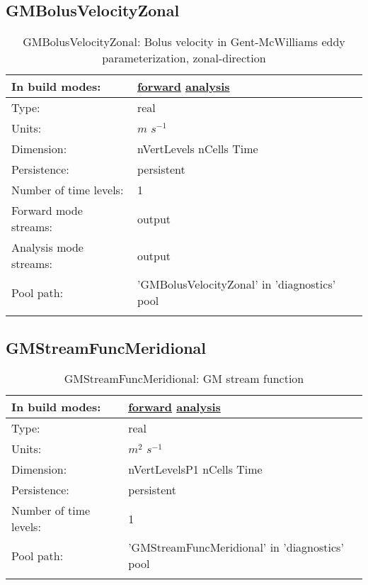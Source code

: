 \subsection[GMBolusVelocityZonal]{GMBolusVelocityZonal}
\label{subsec:var_sec_diagnostics_GMBolusVelocityZonal}
\begin{center}
\begin{longtable}{| p{2.0in} | p{4.0in} |}
        \hline 
        In build modes: & \hyperref[subsec:forward_var_tab_diagnostics]{forward} \hyperref[subsec:analysis_var_tab_diagnostics]{analysis} \\
        \hline 
        Type: & real \\
        \hline 
        Units: & $m$ $s^{-1}$ \\
        \hline 
        Dimension: & nVertLevels nCells Time \\
        \hline 
        Persistence: & persistent \\
        \hline 
        Number of time levels: & 1 \\
        \hline 
		 Forward mode streams: &  output \\
        \hline 
		 Analysis mode streams: &  output \\
        \hline 
            Pool path: & 'GMBolusVelocityZonal' in 'diagnostics' pool
 \\
		 \hline 
    \caption{GMBolusVelocityZonal: Bolus velocity in Gent-McWilliams eddy parameterization, zonal-direction}
\end{longtable}
\end{center}
\subsection[GMStreamFuncMeridional]{GMStreamFuncMeridional}
\label{subsec:var_sec_diagnostics_GMStreamFuncMeridional}
\begin{center}
\begin{longtable}{| p{2.0in} | p{4.0in} |}
        \hline 
        In build modes: & \hyperref[subsec:forward_var_tab_diagnostics]{forward} \hyperref[subsec:analysis_var_tab_diagnostics]{analysis} \\
        \hline 
        Type: & real \\
        \hline 
        Units: & $m^2$ $s^{-1}$ \\
        \hline 
        Dimension: & nVertLevelsP1 nCells Time \\
        \hline 
        Persistence: & persistent \\
        \hline 
        Number of time levels: & 1 \\
        \hline 
            Pool path: & 'GMStreamFuncMeridional' in 'diagnostics' pool
 \\
		 \hline 
    \caption{GMStreamFuncMeridional: GM stream function}
\end{longtable}
\end{center}
